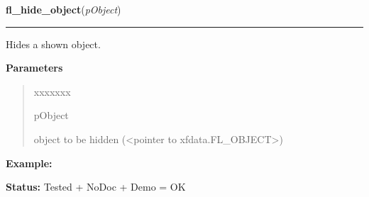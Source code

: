 \hspace{.8\funcindent}\begin{boxedminipage}{\funcwidth}

    \raggedright \textbf{fl\_hide\_object}(\textit{pObject})

    \vspace{-1.5ex}

    \rule{\textwidth}{0.5\fboxrule}
\setlength{\parskip}{2ex}
    Hides a shown object.

\setlength{\parskip}{1ex}
      \textbf{Parameters}
      \vspace{-1ex}

      \begin{quote}
        \begin{Ventry}{xxxxxxx}

          \item[pObject]

          object to be hidden ({\textless}pointer to 
          xfdata.FL\_OBJECT{\textgreater})

        \end{Ventry}

      \end{quote}

\textbf{Example:} 

\textbf{Status:} Tested + NoDoc + Demo = OK



    \end{boxedminipage}

    \label{xformslib:library:fl_object_is_visible}

    \vspace{0.5ex}

